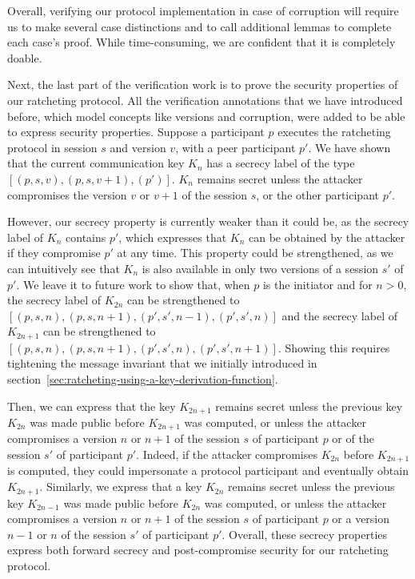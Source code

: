 Overall, verifying our protocol implementation in case of corruption will require us to make several case distinctions and to call additional lemmas to complete each case's proof.
While time-consuming, we are confident that it is completely doable.

Next, the last part of the verification work is to prove the security properties of our ratcheting protocol.
All the verification annotations that we have introduced before, which model concepts like versions and corruption, were added to be able to express security properties.
Suppose a participant $p$ executes the ratcheting protocol in session $s$ and version $v$, with a peer participant $p'$.
We have shown that the current communication key $K_n$ has a secrecy label of the type $[(p,s,v),(p,s,v+1),(p')]$.
$K_n$ remains secret unless the attacker compromises the version $v$ or $v+1$ of the session $s$, or the other participant $p'$.

However, our secrecy property is currently weaker than it could be, as the secrecy label of $K_n$ contains $p'$, which expresses that $K_n$ can be obtained by the attacker if they compromise $p'$ at any time.
This property could be strengthened, as we can intuitively see that $K_n$ is also available in only two versions of a session $s'$ of $p'$.
We leave it to future work to show that, when $p$ is the initiator and for $n>0$, the secrecy label of $K_{2n}$ can be strengthened to $[(p,s,n),(p,s,n+1),(p',s',n-1),(p',s',n)]$ and the secrecy label of $K_{2n+1}$ can be strengthened to $[(p,s,n),(p,s,n+1),(p',s',n),(p',s',n+1)]$.
Showing this requires tightening the message invariant that we initially introduced in section~\ref{sec:ratcheting-using-a-key-derivation-function}. 

Then, we can express that the key $K_{2n+1}$ remains secret unless the previous key $K_{2n}$ was made public before $K_{2n+1}$ was computed, or unless the attacker compromises a version $n$ or $n+1$ of the session $s$ of participant $p$ or of the session $s'$ of participant $p'$.
Indeed, if the attacker compromises $K_{2n}$ before $K_{2n+1}$ is computed, they could impersonate a protocol participant and eventually obtain $K_{2n+1}$.
Similarly, we express that a key $K_{2n}$ remains secret unless the previous key $K_{2n-1}$ was made public before $K_{2n}$ was computed, or unless the attacker compromises a version $n$ or $n+1$ of the session $s$ of participant $p$ or a version $n-1$ or $n$ of the session $s'$ of participant $p'$.
Overall, these secrecy properties express both forward secrecy and post-compromise security for our ratcheting protocol.

